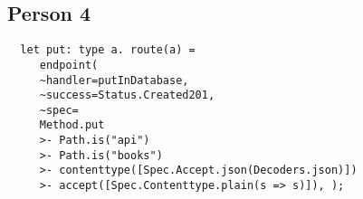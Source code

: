 \begin{appendices}
\subsection{Person 4}\label{putperson4}
\begin{lstlisting}
  let put: type a. route(a) = 
     endpoint( 
	 ~handler=putInDatabase, 
	 ~success=Status.Created201, 
   	 ~spec=
     Method.put 
	 >- Path.is("api") 
	 >- Path.is("books") 
	 >- contenttype([Spec.Accept.json(Decoders.json)]) 
	 >- accept([Spec.Contenttype.plain(s => s)]), );
\end{lstlisting}

\end{appendices}

